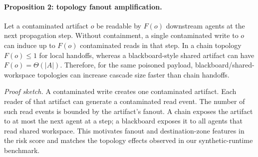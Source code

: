 \paragraph{Proposition 2: topology fanout amplification.}
Let a contaminated artifact $o$ be readable by $F(o)$ downstream agents at the next propagation step. Without containment, a single contaminated write to $o$ can induce up to $F(o)$ contaminated reads in that step. In a chain topology $F(o)\leq 1$ for local handoffs, whereas a blackboard-style shared artifact can have $F(o)=\Theta(|A|)$. Therefore, for the same poisoned payload, blackboard/shared-workspace topologies can increase cascade size faster than chain handoffs.

\emph{Proof sketch.} A contaminated write creates one contaminated artifact. Each reader of that artifact can generate a contaminated read event. The number of such read events is bounded by the artifact's fanout. A chain exposes the artifact to at most the next agent at a step; a blackboard exposes it to all agents that read shared workspace. This motivates fanout and destination-zone features in the risk score and matches the topology effects observed in our synthetic-runtime benchmark.
